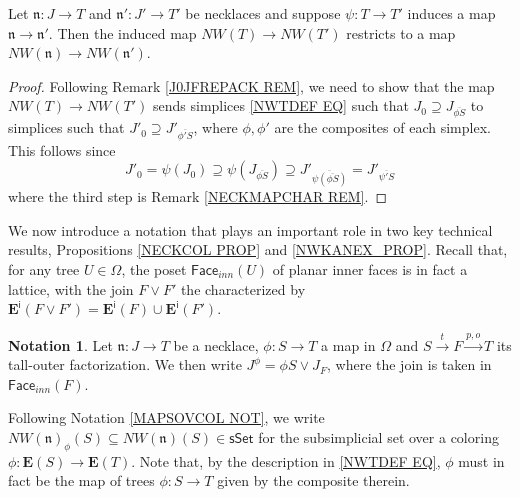 \documentclass{hha}
\theoremstyle{definition} %
\newtheorem{notation}[theorem]{Notation}%
\newcommand{\sSet}{\mathsf{sSet}}
\begin{document}
\begin{corollary}\label{NWTNS_NNAT_COR}
	Let $\mathfrak{n} \colon J \to T$ and
	$\mathfrak{n}' \colon J' \to T'$
	be necklaces and suppose 
	$\psi \colon T\to T'$
	induces a map $\mathfrak{n} \to \mathfrak{n}'$.
%	
	Then the induced map
	$NW(T) \to NW(T')$
	restricts to a map
	$NW(\mathfrak{n}) \to NW(\mathfrak{n}')$.
\end{corollary}



\begin{proof}
	Following Remark \ref{J0JFREPACK REM},
	we need to show that the map
	$NW(T) \to NW(T')$
	sends simplices \eqref{NWTDEF EQ}
	such that
	$J_0 \supseteq 
	J_{\overline{\phi S}}$
	to simplices such that
	$J'_0 \supseteq 
	J'_{\overline{\phi' S}}$,
	where $\phi,\phi'$ are the composites of each simplex.
	This follows since
\[
	J'_0 = 
	\psi (J_0) \supseteq
	\psi (J_{\overline{\phi S}})
	\supseteq
	J'_{\overline{\psi (\overline{\phi S})}}
	=
	J'_{\overline{\psi' S}}
\]	
where the third step is
Remark \ref{NECKMAPCHAR REM}.
\end{proof}



We now introduce a notation that plays an important role 
in two key technical results,
Propositions \ref{NECKCOL PROP} and 
\ref{NWKANEX_PROP}.
Recall that, for any tree 
$U \in \Omega$, 
the poset $\mathsf{Face}_{inn}(U)$
of planar inner faces is in fact a lattice,
with the join $F \vee F'$
the characterized by
$\boldsymbol{E}^{\mathsf{i}}(F \vee F') 
=
\boldsymbol{E}^{\mathsf{i}}(F)
\cup
\boldsymbol{E}^{\mathsf{i}}(F')$.


\begin{notation}\label{STAU NOT}
	Let $\mathfrak{n} \colon J \to T$
	be a necklace,
	$\phi\colon S \to T$ a map in $\Omega$
	and $S \xrightarrow{t} F \xrightarrow{p,o} T$
	its tall-outer factorization.
%
	We then write
	$J^{\phi} = \phi S \vee J_{F}$,
	where the join is 
	taken in $\mathsf{Face}_{inn}(F)$.
\end{notation}

\begin{remark}
	Following Notation \ref{MAPSOVCOL NOT},
	we write $NW(\mathfrak{n})_{\phi}(S) \subseteq NW(\mathfrak{n})(S) \in \sSet$
	for the subsimplicial set 
	over a coloring $\phi \colon \boldsymbol{E}(S) \to \boldsymbol{E}(T)$.
	Note that,
	by the description in \eqref{NWTDEF EQ},
	$\phi$ must in fact be the map of trees $\phi\colon S \to T$
	given by the composite therein.
\end{remark}
\end{document}
